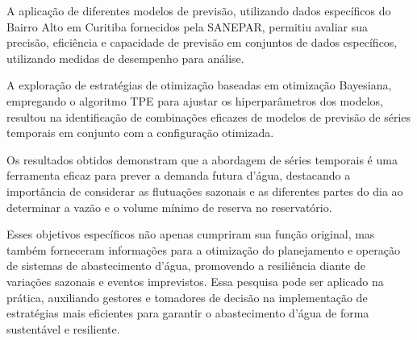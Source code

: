 A aplicação de diferentes modelos de previsão, utilizando dados específicos do Bairro Alto em Curitiba fornecidos pela SANEPAR, permitiu avaliar sua precisão, eficiência e capacidade de previsão em conjuntos de dados específicos, utilizando medidas de desempenho para análise.

A exploração de estratégias de otimização baseadas em otimização Bayesiana, empregando o algoritmo TPE para ajustar os hiperparâmetros dos modelos, resultou na identificação de combinações eficazes de modelos de previsão de séries temporais em conjunto com a configuração otimizada.

Os resultados obtidos demonstram que a abordagem de séries temporais é uma ferramenta eficaz para prever a demanda futura d'água, destacando a importância de considerar as flutuações sazonais e as diferentes partes do dia ao determinar a vazão e o volume mínimo de reserva no reservatório.

Esses objetivos específicos não apenas cumpriram sua função original, mas também forneceram informações para a otimização do planejamento e operação de sistemas de abastecimento d'água, promovendo a resiliência diante de variações sazonais e eventos imprevistos. Essa pesquisa pode ser aplicado na prática, auxiliando gestores e tomadores de decisão na implementação de estratégias mais eficientes para garantir o abastecimento d'água de forma sustentável e resiliente.


%
%
%
%




